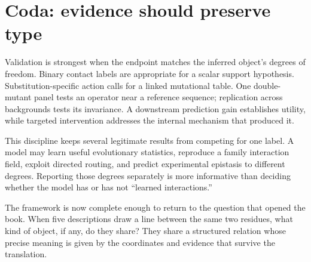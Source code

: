 \section*{Coda: evidence should preserve type}

Validation is strongest when the endpoint matches the inferred object's degrees of freedom.
Binary contact labels are appropriate for a scalar support hypothesis.  Substitution-specific
action calls for a linked mutational table.  One double-mutant panel tests an operator near a
reference sequence; replication across backgrounds tests its invariance.  A downstream prediction
gain establishes utility, while targeted intervention addresses the internal mechanism that
produced it.

This discipline keeps several legitimate results from competing for one label.  A model may learn
useful evolutionary statistics, reproduce a family interaction field, exploit directed routing,
and predict experimental epistasis to different degrees.  Reporting those degrees separately is
more informative than deciding whether the model has or has not ``learned interactions.''

The framework is now complete enough to return to the question that opened the book.  When five
descriptions draw a line between the same two residues, what kind of object, if any, do they share?
They share a structured relation whose precise meaning is given by the coordinates and evidence
that survive the translation.
